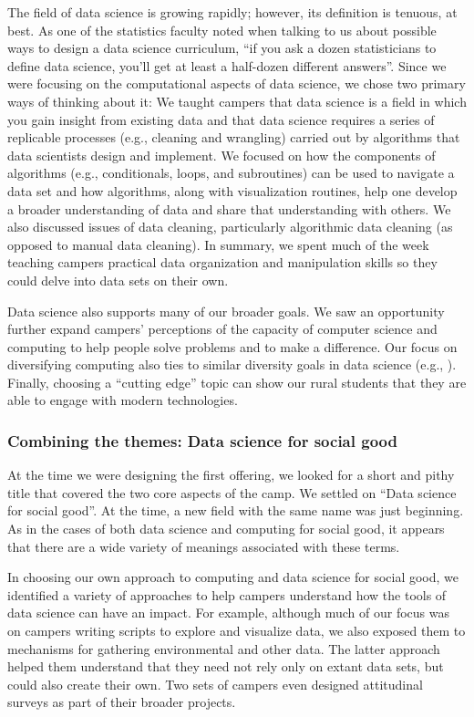 The field of data science is growing rapidly; however,
its definition is tenuous, at best.  As one of the statistics faculty
noted when talking to us about possible ways to design a data science
curriculum, ``if you ask a dozen statisticians to define data
science, you'll get at least a half-dozen different answers''.
Since we were focusing on the computational aspects of data science,
we chose two primary ways of thinking about it: We taught campers
that data science is a field in which you gain insight from existing
data and that data science requires a series of replicable processes
(e.g., cleaning and wrangling) carried out by algorithms that data
scientists design and implement.  We focused on how the components
of algorithms (e.g., conditionals,  loops, and subroutines) can be
used to navigate a data set and how algorithms, along with visualization
routines, help one develop a broader understanding of data and share
that understanding with others.  We also discussed issues of data
cleaning, particularly algorithmic data cleaning (as opposed to
manual data cleaning).  In summary, we spent much of the week
teaching campers practical data organization and manipulation skills
so they could delve into data sets on their own.

Data science also supports many of our broader goals.  We saw an opportunity
further expand campers' perceptions of the capacity of computer
science and computing to help people solve problems and to make a
difference.  Our focus on diversifying computing also ties to similar
diversity goals in data science (e.g., \cite{Berman2015}).  Finally,
choosing a ``cutting edge'' topic can show our rural students that
they are able to engage with modern technologies.

\subsubsection{Combining the themes: Data science for social good}

At the time we were designing the first offering, we looked
for a short and pithy title that covered the two core aspects of the camp.
We settled on ``Data science for social good''.  At the time, a
new field with the same name was just beginning.  As in the cases of
both data science and computing for social good, it appears that there
are a wide variety of meanings associated with these terms.

In choosing our own approach to computing and data science for
social good, we identified a variety of approaches to help campers
understand how the tools of data science can have an impact.  For
example, although much of our focus was on campers writing scripts
to explore and visualize data, we also exposed them to mechanisms
for gathering environmental and other data.  The latter approach
helped them understand that they need not rely only on extant data
sets, but could also create their own.  Two sets of campers even
designed attitudinal surveys as part of their broader projects.

